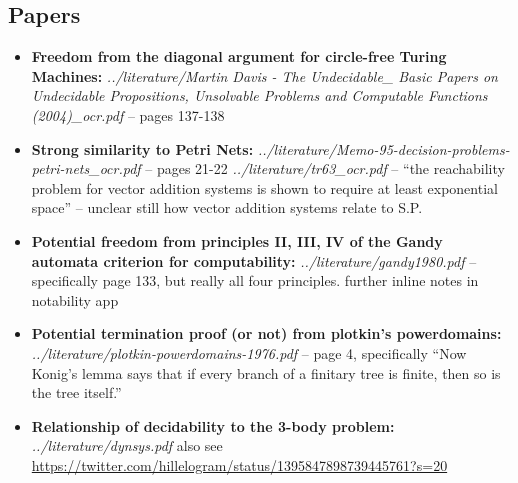 \documentclass{article}
\begin{document}
\subsection{Papers}
\begin{itemize}
  \item \textbf{Freedom from the diagonal argument for circle-free Turing Machines:} \textit{../literature/Martin Davis - The Undecidable\_ Basic Papers on Undecidable Propositions, Unsolvable Problems and Computable Functions (2004)\_ocr.pdf} -- pages 137-138
  \item {} \label{petri-net} \textbf{Strong similarity to Petri Nets:} \textit{../literature/Memo-95-decision-problems-petri-nets\_ocr.pdf} -- pages 21-22
    \textit{../literature/tr63\_ocr.pdf} -- ``the reachability problem for vector addition systems is shown to require at least exponential space'' -- unclear still how vector addition systems relate to S.P.
  \item \textbf{Potential freedom from principles II, III, IV of the Gandy automata criterion for computability:} \textit{../literature/gandy1980.pdf} -- specifically page 133, but really all four principles. further inline notes in notability app
  \item \textbf{Potential termination proof (or not) from plotkin's powerdomains:} \textit{../literature/plotkin-powerdomains-1976.pdf} -- page 4, specifically ``Now Konig’s
lemma says that if every branch of a finitary tree is finite, then so is the tree
itself.''
  \item \textbf{Relationship of decidability to the 3-body problem:} \textit{../literature/dynsys.pdf} also see \url{https://twitter.com/hillelogram/status/1395847898739445761?s=20}
\end{itemize}
\end{document}
